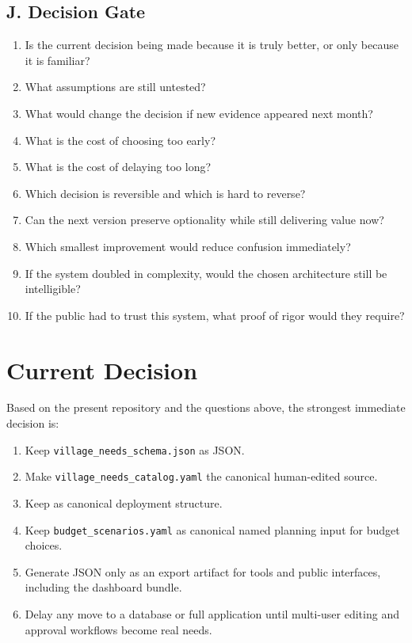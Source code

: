 \documentclass[11pt,a4paper]{article}
\begin{document}
\subsection{J. Decision Gate}
\begin{enumerate}
    \item Is the current decision being made because it is truly better, or only because it is familiar?
    \item What assumptions are still untested?
    \item What would change the decision if new evidence appeared next month?
    \item What is the cost of choosing too early?
    \item What is the cost of delaying too long?
    \item Which decision is reversible and which is hard to reverse?
    \item Can the next version preserve optionality while still delivering value now?
    \item Which smallest improvement would reduce confusion immediately?
    \item If the system doubled in complexity, would the chosen architecture still be intelligible?
    \item If the public had to trust this system, what proof of rigor would they require?
\end{enumerate}

\section{Current Decision}

Based on the present repository and the questions above, the strongest immediate decision is:

\begin{enumerate}
    \item Keep \texttt{village\_needs\_schema.json} as JSON.
    \item Make \texttt{village\_needs\_catalog.yaml} the canonical human-edited source.
    \item Keep  as canonical deployment structure.
    \item Keep \texttt{budget\_scenarios.yaml} as canonical named planning input for budget choices.
    \item Generate JSON only as an export artifact for tools and public interfaces, including the dashboard bundle.
    \item Delay any move to a database or full application until multi-user editing and approval workflows become real needs.
\end{enumerate}
\end{document}
